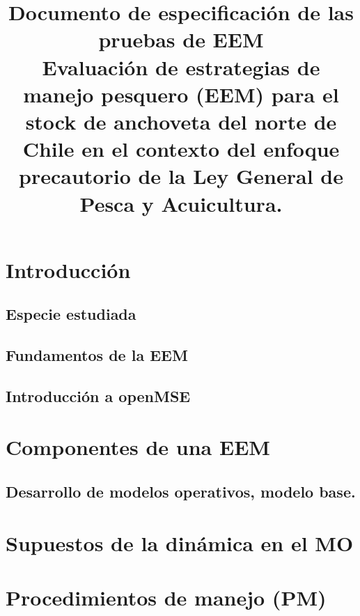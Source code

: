 \documentclass{article}[H]
\title{\textbf{Documento de especificación de las pruebas de EEM} \\
\large Evaluación de estrategias de manejo pesquero (EEM) para el stock de anchoveta del norte de Chile en el contexto del enfoque precautorio de la Ley General de Pesca y Acuicultura.}
\author{}
\date{}
\begin{document}
 
\maketitle

\section{Introducción}



\subsection{Especie estudiada}



\subsection{Fundamentos de la EEM}



\subsection{Introducción a openMSE}



\section{Componentes de una EEM}



\subsection{Desarrollo de modelos operativos, modelo base.}



\section{Supuestos de la dinámica en el MO}



\section{Procedimientos de manejo (PM)}
\end{document}
